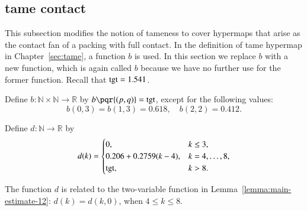 \documentclass{llncs}
\def\op#1{{\hbox{#1}}}
\newcommand{\ring}[1]{\mathbb{#1}}
\begin{document}
\subsection{tame contact}

This subsection modifies the notion of tameness to cover hypermaps
that arise as the contact fan of a packing with full contact.  In the
definition of tame hypermap in Chapter~\ref{sec:tame}, a function $b$
is used.  In this section we replace $b$ with a new function, which is
again called $b$ because we have no further use for the former
function.  Recall that $\op{tgt}=1.541$.  %
%

\begin{definition}[b]
  Define $b:\ring{N}\times \ring{N}\to \ring{R}$ by
  $b\pqr{(p,q)}=\op{tgt}$, except for the following values:
\[
b(0,3)=b(1,3)=0.618,\quad b(2,2)=0.412.
\]
\end{definition}
%

\begin{definition}[d]
Define $d:\ring{N}\to \ring{R}$ by
\[d(k) = \begin{cases}
0, & k\le 3, \\
0.206 + 0.2759 (k-4),& k=4,\ldots,8,\\
\op{tgt},& k>8.\\
\end{cases}
\]
\end{definition}
%

The function $d$ is related to the two-variable function in
Lemma~\ref{lemma:main-estimate-12}: $d(k) = d(k,0)$, when $4\le k\le
8$.
\end{document}

